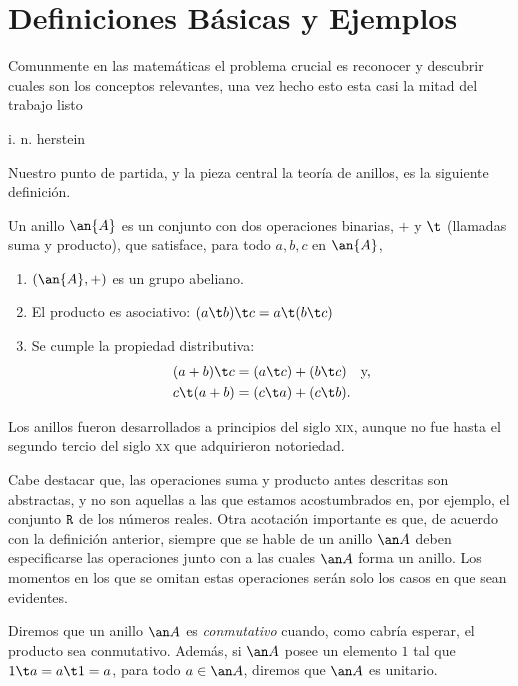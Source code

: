 %

\chapter{Definiciones Básicas y Ejemplos} 
\epigraph{Comunmente en las matemáticas el problema crucial es reconocer y descubrir cuales son los conceptos relevantes, una vez hecho esto esta casi la mitad del trabajo listo}{i. n. herstein}

{\noindent Nuestro punto de partida, y la pieza central la teoría de anillos, es la siguiente definición.}

\begin{defi}[anillo]
	Un anillo $\an{A}$ es un conjunto con dos operaciones binarias, $+$ y $\t$ (llamadas suma y producto), que satisface, para todo $a,b,c$ en $\an{A}$,
	\begin{enumerate} 
		\item $(\an{A},+)$ es un grupo abeliano.
		\item El producto es asociativo: $(a \t b) \t c = a \t (b \t c)$
		\item Se cumple la propiedad distributiva:
		\begin{align*}
		(a+b) \t c &= (a\t c) + (b\t c) \quad \text{y,} \\
		c\t (a+b)  &= (c\t a) + (c\t b).
		\end{align*} 
	\end{enumerate}
\end{defi}
\begin{nota}
	Los anillos fueron desarrollados a principios del siglo \textsc{xix}, aunque no fue hasta el segundo tercio del siglo \textsc{xx} que adquirieron notoriedad.
\end{nota}
%
Cabe destacar que, las operaciones suma y producto antes descritas son abstractas, y no son aquellas a las que estamos acostumbrados en, por ejemplo, el conjunto $\texttt{R}$ de los números rea\-les. Otra acotación importante es que, de acuerdo con la definición anterior, siempre que se hable de un anillo $\an A$ deben especificarse las operaciones junto con a las cuales $\an A$ forma un anillo. Los momentos en los que se omitan estas operaciones serán solo los casos en que sean evidentes.

Diremos que un anillo $\an A$ es \textit{conmutativo} cuando, como cabría esperar, el producto sea conmutativo. Además, si $\an A$ posee un elemento $1$ tal que $1 \t a = a\t 1 = a$, para todo $a \in\an A$, diremos que $\an A$ es  unitario.

